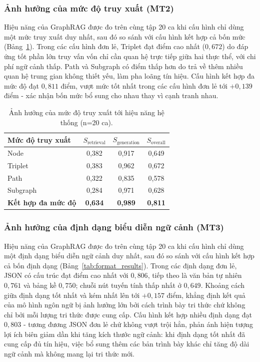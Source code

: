 \subsubsection{Ảnh hưởng của mức độ truy xuất (MT2)}
\label{sec:results_granularity}

Hiệu năng của GraphRAG được đo trên cùng tập 20 ca khi cấu hình chỉ dùng một mức truy xuất duy nhất, sau đó so sánh với cấu hình kết hợp cả bốn mức (Bảng~\ref{tab:granularity_results}). Trong các cấu hình đơn lẻ, Triplet đạt điểm cao nhất ($0,672$) do đáp ứng tốt phần lớn truy vấn vốn chỉ cần quan hệ trực tiếp giữa hai thực thể, với chi phí ngữ cảnh thấp. Path và Subgraph có điểm thấp hơn do trả về thêm nhiều quan hệ trung gian không thiết yếu, làm pha loãng tín hiệu. Cấu hình kết hợp đa mức độ đạt $0,811$ điểm, vượt mức tốt nhất trong các cấu hình đơn lẻ tới $+0,139$ điểm - xác nhận bốn mức bổ sung cho nhau thay vì cạnh tranh nhau.

\begin{table}[h]
\centering
\caption{Ảnh hưởng của mức độ truy xuất tới hiệu năng hệ thống (n=20 ca).}
\label{tab:granularity_results}
\begin{tabular}{lccc}
\hline
\textbf{Mức độ truy xuất} & \textbf{$S_{\text{retrieval}}$} & \textbf{$S_{\text{generation}}$} & \textbf{$S_{\text{overall}}$} \\
\hline
Node              & 0,382 & 0,917 & 0,649 \\
Triplet           & 0,383 & 0,962 & 0,672 \\
Path              & 0,322 & 0,835 & 0,578 \\
Subgraph          & 0,284 & 0,971 & 0,628 \\
\textbf{Kết hợp đa mức độ} & \textbf{0,634} & \textbf{0,989} & \textbf{0,811} \\
\hline
\end{tabular}
\end{table}

\subsubsection{Ảnh hưởng của định dạng biểu diễn ngữ cảnh (MT3)}
\label{sec:results_format}

Hiệu năng của GraphRAG được đo trên cùng tập 20 ca khi cấu hình chỉ dùng một định dạng biểu diễn ngữ cảnh duy nhất, sau đó so sánh với cấu hình kết hợp cả bốn định dạng (Bảng~\ref{tab:format_results}). Trong các định dạng đơn lẻ, JSON có cấu trúc đạt điểm cao nhất với $0,806$, tiếp theo là văn bản tự nhiên $0,761$ và bảng kề $0,750$; chuỗi nút tuyến tính thấp nhất ở $0,649$. Khoảng cách giữa định dạng tốt nhất và kém nhất lên tới $+0,157$ điểm, khẳng định kết quả của mô hình ngôn ngữ bị ảnh hưởng lớn bởi cách trình bày tri thức chứ không chỉ bởi mỗi lượng tri thức được cung cấp. Cấu hình kết hợp nhiều định dạng đạt $0,803$ - tương đương JSON đơn lẻ chứ không vượt trội hẳn, phản ánh hiện tượng lợi ích biên giảm dần khi tăng kích thước ngữ cảnh: khi định dạng tốt nhất đã cung cấp đủ tín hiệu, việc bổ sung thêm các bản trình bày khác chỉ tăng độ dài ngữ cảnh mà không mang lại tri thức mới.

